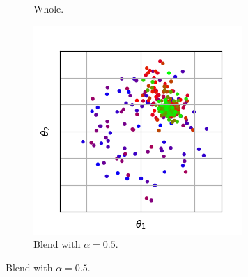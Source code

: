 \documentclass{llncs}
\begin{document}
\begin{figure}[t]
\begin{subfigure}[t]{0.24\textwidth}
        \caption{Whole.}
        \label{subfig:recomb_whole_01}
    \end{subfigure}
    \begin{subfigure}[t]{0.24\textwidth}
        \centering
        \captionsetup{width=.9\textwidth}
        \includegraphics[width=\textwidth]{figures/recombination/simple_normal-100-10_blend-0.5_0-1.png}
        \caption{Blend with $\alpha=0.5$.}
        \label{subfig:recomb_blend_01}
    \end{subfigure}
    

\end{figure}
\end{document}
